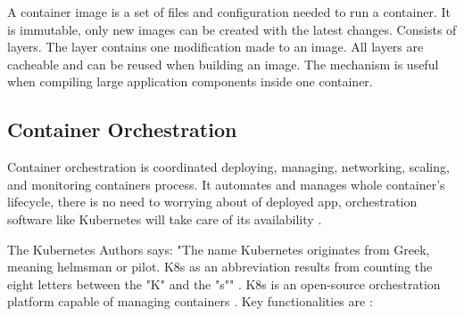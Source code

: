 A container image is a set of files and configuration needed to run a container. It is immutable, only new images can be created with the latest changes. Consists of layers. The layer contains one modification made to an image. All layers are cacheable and can be reused when building an image. The mechanism is useful when compiling large application components inside one container\cite{DockerImage}. 


\subsection{Container Orchestration}
\label{sec:ContainerOrchestration}

Container orchestration is coordinated deploying, managing, networking, scaling, and monitoring containers process. It automates and manages whole container's lifecycle, there is no need to worrying about of deployed app, orchestration software like Kubernetes will take care of its availability \cite{RedhatContainerization}.

The Kubernetes Authors says: "The name Kubernetes originates from Greek, meaning helmsman or pilot. K8s as an abbreviation results from counting the eight letters between the "K" and the "s"" \cite{KubernetesDocs}. K8s is an open-source orchestration platform capable of managing containers \cite{KubernetesDocs}. Key functionalities are \cite{KubernetesDocs}:

